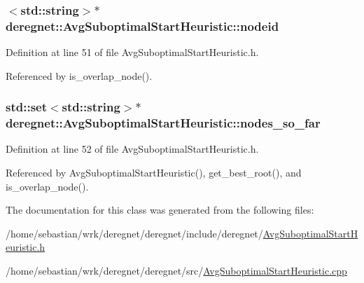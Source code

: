 \subsubsection[{\texorpdfstring{nodeid}{nodeid}}]{$<$std\+::string$>$$\ast$ deregnet\+::\+Avg\+Suboptimal\+Start\+Heuristic\+::nodeid\hspace{0.3cm}{\ttfamily [private]}}\hypertarget{classderegnet_1_1AvgSuboptimalStartHeuristic_af59e6b6ba10fd5d2c210a0947cf37e66}{}\label{classderegnet_1_1AvgSuboptimalStartHeuristic_af59e6b6ba10fd5d2c210a0947cf37e66}


Definition at line 51 of file Avg\+Suboptimal\+Start\+Heuristic.\+h.



Referenced by is\+\_\+overlap\+\_\+node().

\subsubsection[{\texorpdfstring{nodes\+\_\+so\+\_\+far}{nodes_so_far}}]{\setlength{\rightskip}{0pt plus 5cm}std\+::set$<$std\+::string$>$$\ast$ deregnet\+::\+Avg\+Suboptimal\+Start\+Heuristic\+::nodes\+\_\+so\+\_\+far\hspace{0.3cm}{\ttfamily [private]}}\hypertarget{classderegnet_1_1AvgSuboptimalStartHeuristic_ac07c2b61bf03b25e1bd87cb353bd4597}{}\label{classderegnet_1_1AvgSuboptimalStartHeuristic_ac07c2b61bf03b25e1bd87cb353bd4597}


Definition at line 52 of file Avg\+Suboptimal\+Start\+Heuristic.\+h.



Referenced by Avg\+Suboptimal\+Start\+Heuristic(), get\+\_\+best\+\_\+root(), and is\+\_\+overlap\+\_\+node().



The documentation for this class was generated from the following files\+:\begin{DoxyCompactItemize}
\item 
/home/sebastian/wrk/deregnet/deregnet/include/deregnet/\hyperlink{AvgSuboptimalStartHeuristic_8h}{Avg\+Suboptimal\+Start\+Heuristic.\+h}\item 
/home/sebastian/wrk/deregnet/deregnet/src/\hyperlink{AvgSuboptimalStartHeuristic_8cpp}{Avg\+Suboptimal\+Start\+Heuristic.\+cpp}\end{DoxyCompactItemize}
